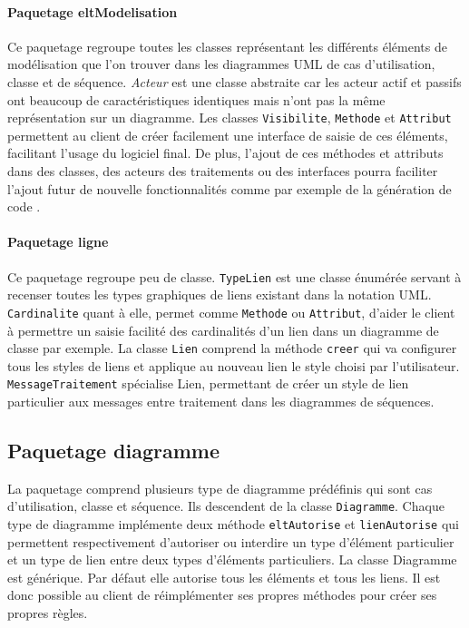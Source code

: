 \documentclass[12pt,a4paper,openany]{report}
\begin{document}
	\paragraph{Paquetage eltModelisation} Ce paquetage regroupe toutes les classes représentant les différents éléments de 
	modélisation que l'on trouver dans les diagrammes UML de cas d'utilisation, classe et de séquence. \textit{Acteur} 
	est une classe abstraite car les acteur actif et passifs ont beaucoup de caractéristiques identiques mais n'ont pas 
	la même représentation sur un diagramme. Les classes \texttt{Visibilite}, \texttt{Methode} et \texttt{Attribut} permettent au client de créer 
	facilement une interface de saisie de ces éléments, facilitant l'usage du logiciel final. De plus, l'ajout de ces 
	méthodes et attributs dans des classes, des acteurs des traitements ou des interfaces pourra faciliter l'ajout futur 
	de nouvelle fonctionnalités comme par exemple de la génération de code .
	\paragraph{Paquetage ligne} Ce paquetage regroupe peu de classe. \texttt{TypeLien} est une classe énumérée servant à recenser
	toutes les types graphiques de liens existant dans la notation UML. \texttt{Cardinalite} quant à elle, permet comme \texttt{Methode} 
	ou \texttt{Attribut}, d'aider le client à permettre un saisie facilité des cardinalités d'un lien dans un diagramme de classe par exemple.
	La classe \texttt{Lien} comprend la méthode \texttt{creer} qui va configurer tous les styles de liens et applique au nouveau lien
	le style choisi par l'utilisateur. \texttt{MessageTraitement} spécialise Lien, permettant de créer un style de lien particulier
	aux messages entre traitement dans les diagrammes de séquences.
	\subsection{Paquetage diagramme}
	La paquetage  comprend plusieurs type de diagramme prédéfinis qui sont cas d'utilisation, classe et séquence.
	Ils descendent de la classe \texttt{Diagramme}. Chaque type de diagramme implémente deux méthode \texttt{eltAutorise} et \texttt{lienAutorise}
	qui permettent respectivement d'autoriser ou interdire un type d'élément particulier et un type de lien entre deux types d'éléments
	particuliers. La classe Diagramme est générique. Par défaut elle autorise tous les éléments et tous les liens. Il est donc possible
	au client de réimplémenter ses propres méthodes pour créer ses propres règles.
\end{document}
